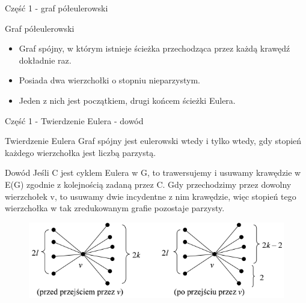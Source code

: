 \documentclass[polish,envcountsect,10pt]{beamer}
\begin{document}
\begin{frame}{Część 1 - graf półeulerowski}
    \begin{block}{Graf półeulerowski}
        \begin{itemize}
            \item Graf spójny, w którym istnieje ścieżka przechodząca przez każdą krawędź dokładnie raz.
            \item Posiada dwa wierzchołki o stopniu nieparzystym.
            \item Jeden z nich jest początkiem, drugi końcem ścieżki Eulera.
        \end{itemize}
    \end{block}
    \begin{center}
    \end{center}
\end{frame}

\begin{frame}{Część 1 - Twierdzenie Eulera - dowód}
\begin{block}{Twierdzenie Eulera}
    Graf spójny jest eulerowski wtedy i tylko wtedy, gdy
    stopień każdego wierzchołka jest liczbą parzystą.
\end{block}
\begin{block}{Dowód}
    Jeśli C jest cyklem Eulera w G, to trawersujemy i usuwamy
    krawędzie w E(G) zgodnie z kolejnością zadaną przez C. Gdy przechodzimy
    przez dowolny wierzchołek v, to usuwamy dwie incydentne z nim krawędzie,
    więc stopień tego wierzchołka w tak zredukowanym grafie pozostaje
    parzysty.
\end{block}
\begin{figure}
    \centering
    \includegraphics[width=0.7\linewidth]{./zal_b.png}
\end{figure}
\end{frame}
\end{document}
